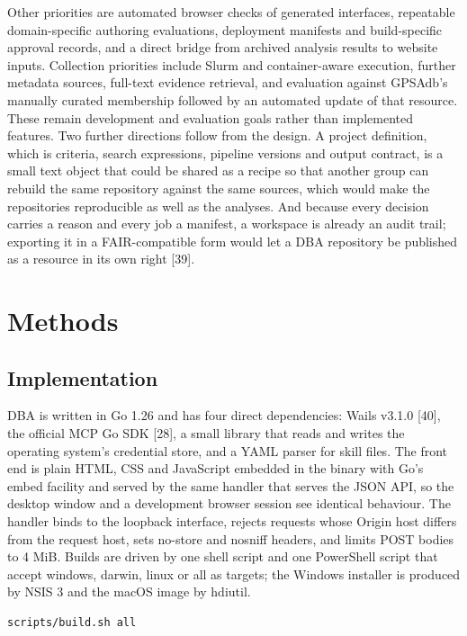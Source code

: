 \documentclass[11pt,a4paper]{article}
\begin{document}
Other priorities are automated browser checks of generated interfaces,
repeatable domain-specific authoring evaluations, deployment manifests
and build-specific approval records, and a direct bridge from archived
analysis results to website inputs. Collection priorities include Slurm
and container-aware execution, further metadata sources, full-text
evidence retrieval, and evaluation against GPSAdb's manually curated
membership followed by an automated update of that resource. These
remain development and evaluation goals rather than implemented features.
Two further directions follow
from the design. A project definition, which is criteria, search
expressions, pipeline versions and output contract, is a small text
object that could be shared as a recipe so that another group can
rebuild the same repository against the same sources, which would make
the repositories reproducible as well as the analyses. And because every
decision carries a reason and every job a manifest, a workspace is
already an audit trail; exporting it in a FAIR-compatible form would let
a DBA repository be published as a resource in its own right {[}39{]}.

\section{Methods}\label{methods}

\subsection{Implementation}\label{implementation}

DBA is written in Go 1.26 and has four direct dependencies: Wails
v3.1.0 {[}40{]}, the official MCP Go SDK {[}28{]}, a small library that
reads and writes the operating system's credential store, and a YAML
parser for skill files. The front end is plain HTML, CSS and
JavaScript embedded in the binary with Go's embed facility and served by
the same handler that serves the JSON API, so the desktop window and a
development browser session see identical behaviour. The handler binds
to the loopback interface, rejects requests whose Origin host differs
from the request host, sets no-store and nosniff headers, and limits
POST bodies to 4 MiB. Builds are driven by one shell script and one
PowerShell script that accept windows, darwin, linux or all as targets;
the Windows installer is produced by NSIS 3 and the macOS image by
hdiutil.

\begin{verbatim}
scripts/build.sh all
\end{verbatim}
\end{document}

